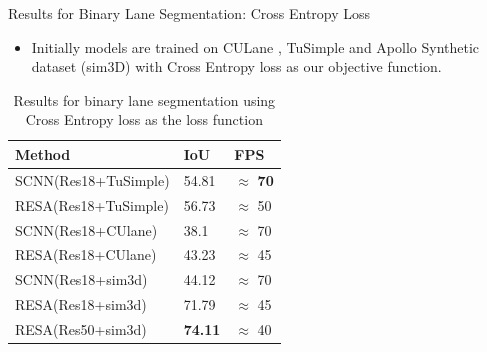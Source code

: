 \documentclass[aspectratio=169]{beamer}
\begin{document}
\begin{frame}{Results for Binary Lane Segmentation: Cross Entropy Loss}
    \begin{itemize}
        \item Initially models are trained on CULane , TuSimple and Apollo Synthetic dataset (sim3D) with Cross Entropy loss as our objective function. 
    \end{itemize}

    \begin{table}[h!]
    \caption{Results for binary lane segmentation using Cross Entropy loss as the loss function}
    \centering
    \begin{tabular}{|l|l|l|}
    \hline
        \textbf{Method} & \textbf{IoU} & \textbf{FPS} \\ \hline
        SCNN(Res18+TuSimple) & 54.81 & $\approx$ \textbf{70}  \\ \hline
        RESA(Res18+TuSimple)  & 56.73 & $\approx$ 50 \\\hline
        SCNN(Res18+CUlane)  & 38.1 & $\approx$ 70 \\ \hline
        RESA(Res18+CUlane)& 43.23 &  $\approx$ 45\\\hline
        SCNN(Res18+sim3d) & 44.12 & $\approx$ 70 \\ \hline
        RESA(Res18+sim3d) & 71.79 & $\approx$ 45 \\ \hline
        RESA(Res50+sim3d) & \textbf{74.11} & $\approx$ 40 \\ \hline
        
    \end{tabular}
\end{table}
\end{frame}
\end{document}
